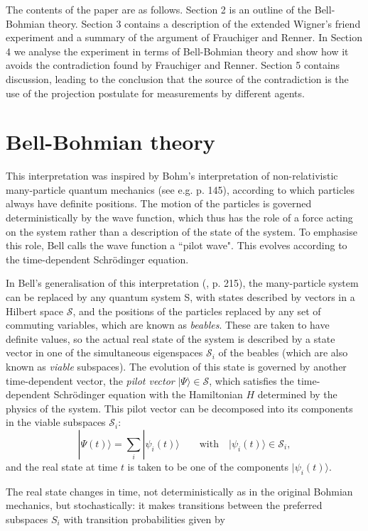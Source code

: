 \documentclass[12pt,a4paper,reqno]{article}
\renewcommand{\(}{\left(}
\renewcommand{\)}{\right)}
\renewcommand{\.}{\centerdot}
\newcommand{\1}{\mathbf{1}}
\renewcommand{\S}{\mathcal{S}}
\newcommand{\<}{\langle}
\renewcommand{\>}{\rangle}
\theoremstyle{definition}
\theoremstyle{remark}
\numberwithin{equation}{section}
\begin{document}
The contents of the paper are as follows. Section 2 is an outline of the Bell-Bohmian theory. Section 3 contains a description of the extended Wigner's friend experiment and a summary of the argument of Frauchiger and Renner. In Section 4 we analyse the experiment in terms of Bell-Bohmian theory and show how it avoids the contradiction found by Frauchiger and Renner. Section 5 contains discussion, leading to the conclusion that the source of the contradiction is the use of the projection postulate for measurements by different agents.

\section{Bell-Bohmian theory}\label{BellBohm}

This interpretation was inspired by Bohm's interpretation of non-relativistic many-particle quantum mechanics (see e.g. \cite{Bohmian} p. 145), according to which particles always have definite positions. The motion of the particles is governed deterministically by the wave function, which thus has the role of a force acting on the system rather than a description of the state of the system. To emphasise this role, Bell \cite{Bell:pilot} calls the wave function a ``pilot wave". This evolves according to the time-dependent Schr\"odinger equation.

In Bell's generalisation of this interpretation (\cite{Bell:beables}, \cite{QMPN} p. 215), the many-particle system can be replaced by any quantum system S, with states described by vectors in a Hilbert space $\mathcal{S}$, and the positions of the particles replaced by any set of commuting variables, which are known as \emph{beables}. These are taken to have definite values, so the actual real state of the system is described by a state vector in one of the simultaneous eigenspaces $\S_i$ of the beables (which are also known \cite{QMPN} as \emph{viable} subspaces). The evolution of this state is governed by another time-dependent vector, the \emph{pilot vector} $|\Psi\>\in \S$, which satisfies the time-dependent Schr\"odinger equation with the Hamiltonian $H$ determined by the physics of the system. This pilot vector can be decomposed into its components in the viable subspaces $\S_i$:
\[
|\Psi(t)\> = \sum_i |\psi_i(t)\> \qquad \text{with} \quad |\psi_i(t)\> \in \S_i,
\]
and the real state at time $t$ is taken to be one of the components $|\psi_i(t)\>$.

The real state changes in time, not deterministically as in the original Bohmian mechanics, but stochastically: it makes transitions between the preferred subspaces $S_i$ with transition probabilities given by 
\end{document}

